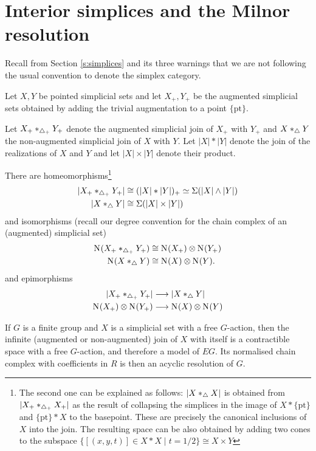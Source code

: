 
\section{Interior simplices and the Milnor resolution}\label{s:milnor}
\begin{warning}
Recall from Section \cref{s:simplices} and its three warnings that we are not following the usual convention to denote the simplex category.
\end{warning}
Let $X, Y$ be pointed simplicial sets and let $X_+, Y_+$ be the augmented simplicial sets obtained by adding the trivial augmentation to a point $\{\mathrm{pt}\}$.

Let $X_+*_{\triangle_{+}}Y_+$ denote the augmented simplicial join of $X_+$ with $Y_+$ and $X *_{\triangle} Y$ the non-augmented simplicial join of $X$ with $Y$. Let $|X|*|Y|$ denote the join of the realizations of $X$ and $Y$ and let $|X|\times |Y|$ denote their product. 

There are homeomorphisms\footnote{The second one can be explained as follows: $|X*_\triangle X|$ is obtained from $|X_+*_{\triangle_{+}} X_+|$ as the result of collapsing the simplices in the image of $X*\{\mathrm{pt}\}$ and $\{\mathrm{pt}\}*X$ to the basepoint. These are precisely the canonical inclusions of $X$ into the join. The resulting space can be also obtained by adding two cones to the subspace $\{[(x,y,t)]\in X*X\mid t=1/2\}\cong X\times Y$}
\begin{align*}
	|X_+*_{\triangle_{+}} Y_+| 
	& \cong 
	(|X| * |Y|)_+
	\simeq
	\Sigma(|X|\wedge |Y|)
	\\
	|X*_{\triangle} Y| & \cong \Sigma (|X|\times |Y|)
\end{align*}
and isomorphisms (recall our degree convention for the chain complex of an (augmented) simplicial set)
\begin{align} \label{eq:chains_join}
	\operatorname{N}_{}(X_+*_{\triangle_{+}} Y_+) &\cong \operatorname{N}_{}(X_+)\otimes \operatorname{N}_{}(Y_+)
	\\
	\operatorname{N}_{}(X*_{\triangle} Y) &\cong \operatorname{N}_{}(X)\otimes \operatorname{N}_{}(Y).
\end{align}
and epimorphisms
\begin{align*}
	|X_+*_{\triangle_{+}} Y_+| &\longrightarrow |X*_{\triangle} Y|
	\\
	\operatorname{N}_{}(X_+)\otimes \operatorname{N}_{}(Y_+) & \longrightarrow
	\operatorname{N}_{}(X)\otimes \operatorname{N}_{}(Y)	
\end{align*}

If $G$ is a finite group and $X$ is a simplicial set with a free $G$-action, then the infinite (augmented or non-augmented) join of $X$ with itself is a contractible space with a free $G$-action, and therefore a model of $EG$. Its normalised chain complex with coefficients in $R$ is then an acyclic resolution of $G$.

